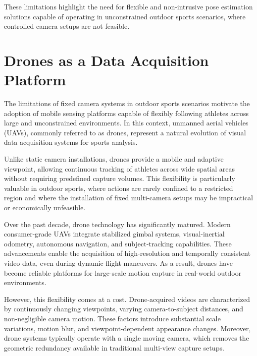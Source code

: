 These limitations highlight the need for flexible and non-intrusive pose estimation solutions capable of operating in unconstrained outdoor sports scenarios, where controlled camera setups are not feasible.

\section{Drones as a Data Acquisition Platform}

The limitations of fixed camera systems in outdoor sports scenarios motivate the adoption of mobile sensing platforms capable of flexibly following athletes across large and unconstrained 
environments. In this context, unmanned aerial vehicles (UAVs), commonly referred to as drones, represent a natural evolution of visual data acquisition systems for sports analysis.

Unlike static camera installations, drones provide a mobile and adaptive viewpoint, allowing continuous tracking of athletes across wide spatial areas without requiring predefined capture 
volumes. This flexibility is particularly valuable in outdoor sports, where actions are rarely confined to a restricted region and where the installation of fixed multi-camera setups may be 
impractical or economically unfeasible.

Over the past decade, drone technology has significantly matured. Modern consumer-grade UAVs integrate stabilized gimbal systems, visual-inertial odometry, autonomous navigation, and 
subject-tracking capabilities. These advancements enable the acquisition of high-resolution and temporally consistent video data, even during dynamic flight maneuvers. As a result, drones have become reliable platforms for large-scale 
motion capture in real-world outdoor environments.

However, this flexibility comes at a cost. Drone-acquired videos are characterized by continuously changing viewpoints, varying camera-to-subject distances, and non-negligible camera motion. These factors introduce substantial scale 
variations, motion blur, and viewpoint-dependent appearance changes. Moreover, drone systems typically operate with a single moving camera, which removes the geometric redundancy available in traditional multi-view capture setups.


